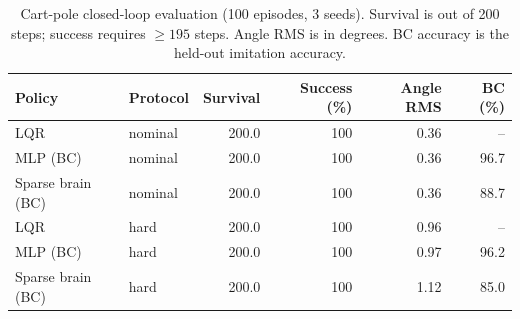 \begin{table}[t]
\centering
\small
\caption{Cart-pole closed-loop evaluation (100 episodes, 3 seeds). Survival is out of 200 steps; success requires $\geq 195$ steps. Angle RMS is in degrees. BC accuracy is the held-out imitation accuracy.}
\label{tab:cartpole}
\begin{tabular}{llrrrr}
\toprule
Policy & Protocol & Survival & Success (\%) & Angle RMS & BC (\%) \\
\midrule
LQR & nominal & 200.0 & 100 & 0.36 & -- \\
MLP (BC) & nominal & 200.0 & 100 & 0.36 & 96.7 \\
Sparse brain (BC) & nominal & 200.0 & 100 & 0.36 & 88.7 \\
LQR & hard & 200.0 & 100 & 0.96 & -- \\
MLP (BC) & hard & 200.0 & 100 & 0.97 & 96.2 \\
Sparse brain (BC) & hard & 200.0 & 100 & 1.12 & 85.0 \\
\bottomrule
\end{tabular}
\end{table}
